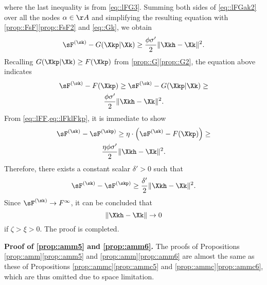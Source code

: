 where the last inequality is from \cref{eq::lFG3}. Summing both sides of \cref{eq::lFGak2} over all the nodes $\alpha\in\AA$ and simplifying the resulting equation with \cref{prop::FsF}\ref{prop::FsF2} and \cref{eq::Gk}, we obtain
\begin{equation}
\nonumber
\sF^{(\sk)} - G(\Xkp|\Xk) \geq \frac{\phi\sigma'}{2}\|\Xkh-\Xk\|^2.
\end{equation}
Recalling $G(\Xkp|\Xk)\geq F(\Xkp)$  from \cref{prop::G}\ref{prop::G2}, the equation above indicates
\begin{multline}\label{eq::lFF}
\sF^{(\sk)} - F(\Xkp) \geq \sF^{(\sk)} - G(\Xkp|\Xk) \geq\\ \frac{\phi\sigma'}{2}\|\Xkh-\Xk\|^2.
\end{multline}
From \cref{eq::lFF,eq::lFklFkp}, it is immediate to show
\begin{multline}
\nonumber
\sF^{(\sk)} - \sF^{(\skp)} \geq \eta\cdot\Big(\sF^{(\sk)}-F(\Xkp)\Big)\geq \\
\frac{\eta\phi\sigma'}{2}\|\Xkh-\Xk\|^2.
\end{multline}
Therefore, there exists a constant scalar $\delta'>0$ such that
\begin{equation}
\sF^{(\sk)} - \sF^{(\skp)} \geq \frac{\delta'}{2}\|\Xkh-\Xk\|^2.
\end{equation}
Since $\sF^{(\sk)} \rightarrow F^{\infty}$, it can be concluded that
\begin{equation}
	\|\Xkh-\Xk\|\rightarrow 0
\end{equation}
if $\zeta>\xi>0$. The proof is completed.
\vspace{0.8em} 

\noindent\textbf{Proof of \ref{prop::amm5} and \ref{prop::amm6}.\;} The proofs of Propositions \ref{prop::amm}\ref{prop::amm5} and \ref{prop::amm}\ref{prop::amm6} are almost the same as these of Propositions \ref{prop::ammc}\ref{prop::ammc5} and \ref{prop::ammc}\ref{prop::ammc6}, which are thus omitted due to space limitation.
